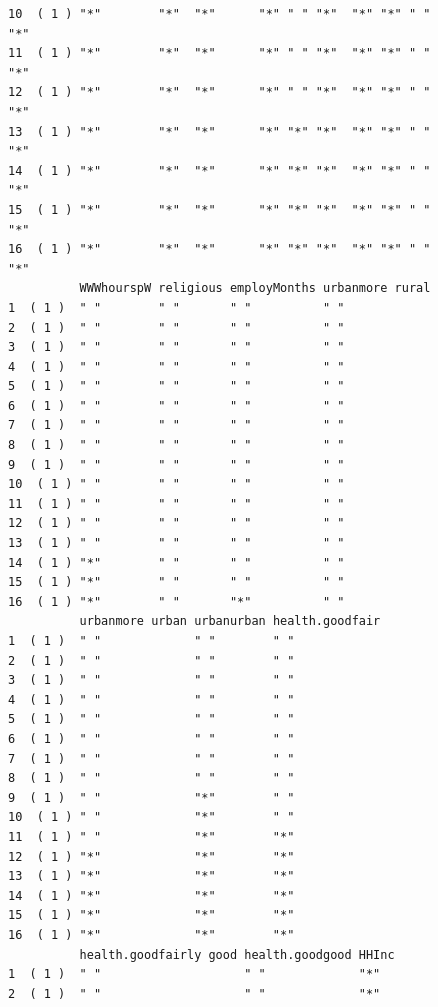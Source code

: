 \documentclass[]{article}
\begin{document}
\begin{verbatim}
10  ( 1 ) "*"        "*"  "*"      "*" " " "*"  "*" "*" " "         "*"  
11  ( 1 ) "*"        "*"  "*"      "*" " " "*"  "*" "*" " "         "*"  
12  ( 1 ) "*"        "*"  "*"      "*" " " "*"  "*" "*" " "         "*"  
13  ( 1 ) "*"        "*"  "*"      "*" "*" "*"  "*" "*" " "         "*"  
14  ( 1 ) "*"        "*"  "*"      "*" "*" "*"  "*" "*" " "         "*"  
15  ( 1 ) "*"        "*"  "*"      "*" "*" "*"  "*" "*" " "         "*"  
16  ( 1 ) "*"        "*"  "*"      "*" "*" "*"  "*" "*" " "         "*"  
          WWWhourspW religious employMonths urbanmore rural
1  ( 1 )  " "        " "       " "          " "            
2  ( 1 )  " "        " "       " "          " "            
3  ( 1 )  " "        " "       " "          " "            
4  ( 1 )  " "        " "       " "          " "            
5  ( 1 )  " "        " "       " "          " "            
6  ( 1 )  " "        " "       " "          " "            
7  ( 1 )  " "        " "       " "          " "            
8  ( 1 )  " "        " "       " "          " "            
9  ( 1 )  " "        " "       " "          " "            
10  ( 1 ) " "        " "       " "          " "            
11  ( 1 ) " "        " "       " "          " "            
12  ( 1 ) " "        " "       " "          " "            
13  ( 1 ) " "        " "       " "          " "            
14  ( 1 ) "*"        " "       " "          " "            
15  ( 1 ) "*"        " "       " "          " "            
16  ( 1 ) "*"        " "       "*"          " "            
          urbanmore urban urbanurban health.goodfair
1  ( 1 )  " "             " "        " "            
2  ( 1 )  " "             " "        " "            
3  ( 1 )  " "             " "        " "            
4  ( 1 )  " "             " "        " "            
5  ( 1 )  " "             " "        " "            
6  ( 1 )  " "             " "        " "            
7  ( 1 )  " "             " "        " "            
8  ( 1 )  " "             " "        " "            
9  ( 1 )  " "             "*"        " "            
10  ( 1 ) " "             "*"        " "            
11  ( 1 ) " "             "*"        "*"            
12  ( 1 ) "*"             "*"        "*"            
13  ( 1 ) "*"             "*"        "*"            
14  ( 1 ) "*"             "*"        "*"            
15  ( 1 ) "*"             "*"        "*"            
16  ( 1 ) "*"             "*"        "*"            
          health.goodfairly good health.goodgood HHInc
1  ( 1 )  " "                    " "             "*"  
2  ( 1 )  " "                    " "             "*"  

\end{verbatim}
\end{document}
